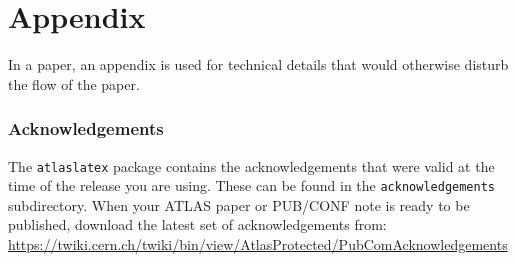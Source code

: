 \documentclass[11pt,twoside]{book}
\begin{document}
\clearpage
\cleardoublepage
{}
\renewcommand{\bibname}{References}
\footnotesize{    
  
%  
  
}%
% 
% 

\clearpage
\appendix
\part*{Appendix}

In a paper, an appendix is used for technical details that would otherwise disturb the flow of the paper.


\cleardoublepage
{}
{}
\printglossary[type=\acronymtype, title=List of Acronyms, toctitle=List of Acronyms]

\clearpage
\section*{Acknowledgements}

%

The \texttt{atlaslatex} package contains the acknowledgements that were valid 
at the time of the release you are using.
These can be found in the \texttt{acknowledgements} subdirectory.
When your ATLAS paper or PUB/CONF note is ready to be published,
download the latest set of acknowledgements from:\\
\url{https://twiki.cern.ch/twiki/bin/view/AtlasProtected/PubComAcknowledgements}
\end{document}
